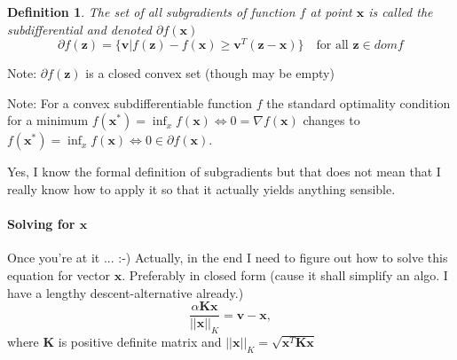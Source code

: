 \documentclass[a4paper]{article}
\newcommand{\vc}[1]{\mathbf{#1}}
\theoremstyle{dotless}
\newtheorem{definition}{Definition}
\numberwithin{equation}{section}
\begin{document}
\begin{definition}
The set of all subgradients of function $f$ at point $\vc{x}$ is called the subdifferential and denoted $\partial f(\vc{x})$
\begin{equation}\label{eq:DefDifferential}
\partial f(\vc{z}) = \{\vc{v}| f(\vc{z}) - f(\vc{x}) \geq \vc{v}^T (\vc{z} - \vc{x}) \} \quad \text{for all } \vc{z} \in dom f
\end{equation}
\end{definition}
Note: $\partial f(\vc{z})$ is a closed convex set (though may be empty)

Note: For a convex subdifferentiable function $f$ the standard optimality condition for a minimum $f(\vc{x}^*) = \inf_x f(\vc{x}) \Leftrightarrow 0=\nabla f(\vc{x})$ changes to 
$f(\vc{x}^*) = \inf_x f(\vc{x}) \Leftrightarrow 0 \in \partial f(\vc{x})$.

Yes, I know the formal definition of subgradients but that does not mean that I really know how to apply it so that it actually yields anything sensible.


\paragraph{Solving for $\vc{x}$} Once you're at it ...  :-)
Actually, in the end I need to figure out how to solve this equation for vector $\vc{x}$. Preferably in closed form (cause it shall simplify an algo. I have a lengthy descent-alternative already.)
\begin{equation}
\frac{\alpha \vc{K} \vc{x}}{||\vc{x}||_K} = \vc{v} - \vc{x},
\end{equation}
where $\vc{K}$ is positive definite matrix and $||\vc{x}||_K = \sqrt{\vc{x}^T \vc{K} \vc{x}}$
\end{document}
